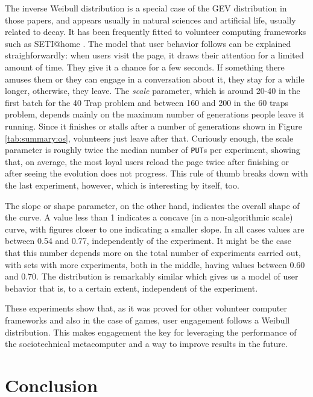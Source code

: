 \documentclass[letterpaper]{article}
\begin{document}
%
The inverse
Weibull distribution is a special case of the GEV distribution
in those papers, and appears usually in natural sciences and
artificial life, usually related to decay. It has been frequently
fitted to volunteer computing frameworks such as SETI@home
\citep{javadi2009mining}. The model that user behavior follows can be
explained straighforwardly: when users visit the page, it draws their
attention for a limited amount of time. They give it a chance for a
few seconds. If something there amuses them or they can engage in a
conversation about it, they stay for a while longer, otherwise, they
leave. The {\em scale} parameter, which is around 20-40 in the first
batch for the 40 Trap problem and between 160 and 200 in the 60 traps
problem, depends mainly on the maximum number of generations people
leave it running. Since it finishes or stalls after a number of
generations shown in Figure \ref{tab:summary:os}, volunteers just
leave after that. Curiously enough, the scale parameter is roughly
twice the median number of {\tt PUT}s per experiment, showing that, on
average, the most loyal users reload the page twice after finishing or
after seeing the evolution does not progress. This rule of thumb
breaks down with the last experiment, however, which is interesting by
itself, too. 

The slope or shape parameter, on the other hand, indicates the overall
shape of the curve. A value less than 1 indicates a concave (in a
non-algorithmic scale) curve,
with figures closer to one indicating a smaller slope. In all cases
values are between 0.54 and 0.77, independently of the experiment. It
might be the case that this number depends more on the total number of
experiments carried out, with sets with more experiments, both in the
middle, having values between 0.60 and 0.70. The distribution is
remarkably similar which gives us a model of user behavior that is, to
a certain extent, independent of the experiment.  

These experiments show that, as it was proved for other volunteer
computer frameworks and also in the case of games, user engagement
follows a Weibull distribution. This makes engagement the key for
leveraging the performance of the sociotechnical metacomputer and a
way to improve results in the future. 

\section{Conclusion}
\label{sec:conclusion}
\end{document}

